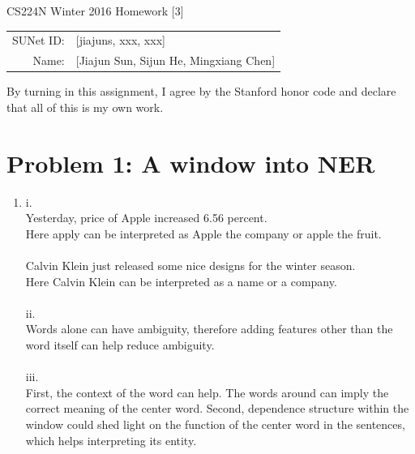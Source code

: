 \documentclass[10pt]{article}
\begin{document}
\begin{center}
{\Large CS224N Winter 2016 Homework [3]}

\begin{tabular}{rl}
SUNet ID: & [jiajuns, xxx, xxx] \\
Name: & [Jiajun Sun, Sijun He, Mingxiang Chen] \\
\end{tabular}
\end{center}

By turning in this assignment, I agree by the Stanford honor code and declare
that all of this is my own work.

\section*{Problem 1: A window into NER}
\begin{enumerate}[label=(\alph*)]
\item
i.\\
Yesterday, price of Apple increased 6.56 percent.\\
Here apply can be interpreted as Apple the company or apple the fruit.\\
\\
Calvin Klein just released some nice designs for the winter season.\\
Here Calvin Klein can be interpreted as a name or a company.\\
\\
ii.\\
Words alone can have ambiguity, therefore adding features other than the word itself can help reduce ambiguity.\\
\\
iii.\\
First, the context of the word can help. The words around can imply the correct meaning of the center word.
Second, dependence structure within the window could shed light on the function of the center word in the sentences, which helps interpreting its entity.


\end{enumerate}
\end{document}
